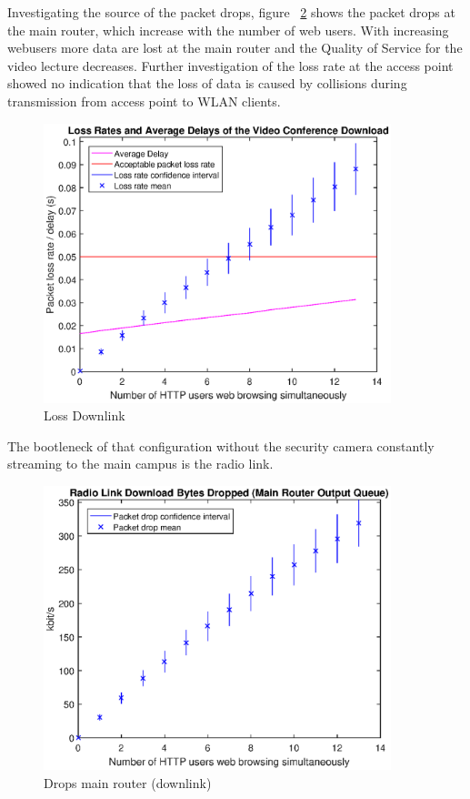 \documentclass[a4paper,10pt]{book}\usepackage{graphicx}
\begin{document}
Investigating the source of the packet drops, figure ~\ref{fig:mainRdrops} shows the packet drops at the main router, which increase with the number of 
web users. With increasing webusers more data are lost at the main router and the Quality of Service for the video lecture decreases. Further investigation of the loss rate at the access point showed no indication that 
the loss of data is caused by collisions during transmission from access point to WLAN clients.

\begin{figure}[!ht]
  \centering
    \label{fig:losslecdown}
    \includegraphics[width=0.9\textwidth]{off_loss_conf_download.eps}
  
    \caption{Loss Downlink}
\end{figure}
The bootleneck of that configuration without the security camera constantly streaming to the main campus 
is the radio link.
\begin{figure}[!ht]
 \label{fig:mainRdrops}
  \centering
    \includegraphics[width=0.9\textwidth]{off_main_router_drops.eps}
    \caption{Drops main router (downlink)}
\end{figure}
\end{document}
